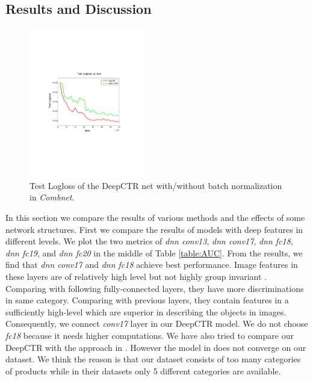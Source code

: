 \documentclass{sig-alternate}
\begin{document}
\subsection{Results and Discussion}
\begin{figure}
	\centering
	\includegraphics[width=0.45\textwidth]{BN_test}
	\caption{Test Logloss of the DeepCTR net with/without batch normalization in \emph{Combnet}. }
	\label{fig:bn}
\end{figure} 
In this section we compare the results of various methods and the effects of some network structures. First we compare the results of  models with deep features in different levels. We plot the two metrics of \emph{dnn conv13}, \emph{dnn conv17}, \emph{dnn fc18}, \emph{dnn fc19}, and \emph{dnn fc20} in the middle of Table \ref{table:AUC}. From the results, we find that \emph{dnn conv17} and \emph{dnn fc18} achieve best performance. Image features in these layers are of relatively high level but not highly group invariant \cite{zeiler2014visualizing}. Comparing with following fully-connected layers, they have more discriminations in same category. Comparing with previous layers, they contain  features in a sufficiently high-level  which are superior in describing the objects in images. Consequently, we connect \emph{conv17} layer in our DeepCTR model. We do not choose \emph{fc18} because it needs higher computations. We have also tried to compare our DeepCTR with the approach in \cite{Mo:2015:IFL:2832747.2832769}. However the model in \cite{Mo:2015:IFL:2832747.2832769} does not converge on our dataset. We think the reason is that our dataset consists of too many categories of products while in their datasets only 5 different categories are available.
\end{document}
